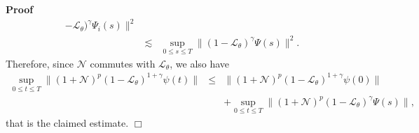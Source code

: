 \documentclass{article}
\newenvironment{proof}{\noindent\textbf{Proof\ }}{\hspace*{\fill}$\Box$\medskip}
\begin{document}
\begin{proof}
\[\begin{array}{lll}
       -\mathcal{L}_{\theta})^{\gamma} \Psi_i (s) \|^2\\
       & \lesssim & \sup_{0 \leqslant s \leqslant T} \| (1
       -\mathcal{L}_{\theta})^{\gamma} \Psi (s) \|^2 .
     \end{array} \]
  Therefore, since $\mathcal{N}$ commutes with $\mathcal{L}_{\theta}$, we also
  have
  \begin{eqnarray*}
    \sup_{0 \leqslant t \leqslant T} \| (1 +\mathcal{N})^p (1
    -\mathcal{L}_{\theta})^{1 + \gamma} \psi (t) \| & \leqslant & \| (1
    +\mathcal{N})^p (1 -\mathcal{L}_{\theta})^{1 + \gamma} \psi (0) \|\\
    &  & + \sup_{0 \leqslant t \leqslant T} \| (1 +\mathcal{N})^p (1
    -\mathcal{L}_{\theta})^{\gamma} \Psi (s) \|,
  \end{eqnarray*}
  that is the claimed estimate.
\end{proof}
\end{document}
